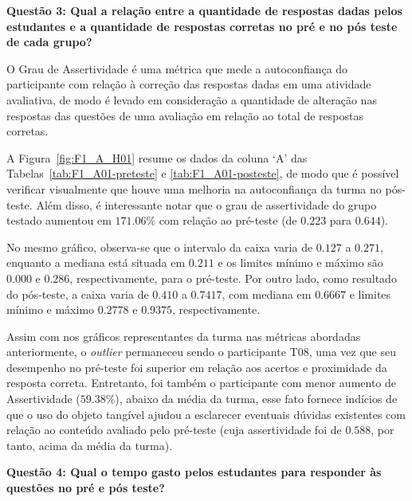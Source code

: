 \textbf{Questão 3: Qual a relação entre a quantidade de respostas dadas pelos estudantes e a quantidade de respostas corretas no pré e no pós teste de cada grupo?}

O Grau de Assertividade é uma métrica que mede a autoconfiança do participante com relação à correção das respostas dadas em uma atividade avaliativa, de modo é levado em consideração a quantidade de alteração nas respostas das questões de uma avaliação em relação ao total de respostas corretas. 

A Figura~\ref{fig:F1_A_H01} resume os dados da coluna `A' das Tabelas~\ref{tab:F1_A01-preteste} e \ref{tab:F1_A01-posteste}, de modo que é possível verificar visualmente que houve uma melhoria na autoconfiança da turma no pós-teste. Além disso, é interessante notar que o grau de assertividade do grupo testado aumentou em $171.06\%$ com relação ao pré-teste (de $0.223$ para $0.644$).

No mesmo gráfico, observa-se que o intervalo da caixa varia de $0.127$ a $0.271$, enquanto a mediana está situada em $0.211$ e os limites mínimo e máximo são $0.000$ e $0.286$, respectivamente, para o pré-teste. Por outro lado, como resultado do pós-teste, a caixa varia de $0.410$ a $0.7417$, com mediana em $0.6667$ e limites mínimo e máximo $0.2778$ e $0.9375$, respectivamente.

Assim com nos gráficos representantes da turma nas métricas abordadas anteriormente, o \textit{outlier} permaneceu sendo o participante T08, uma vez que seu desempenho no pré-teste foi superior em relação aos acertos e proximidade da resposta correta. Entretanto, foi também o participante com menor aumento de Assertividade ($59.38\%$), abaixo da média da turma, esse fato fornece indícios de que o uso do objeto tangível ajudou a esclarecer eventuais dúvidas existentes com relação ao conteúdo avaliado pelo pré-teste (cuja assertividade foi de $0.588$, por tanto, acima da média da turma).


\textbf{Questão 4: Qual o tempo gasto pelos estudantes para responder às questões no pré e pós teste?}

